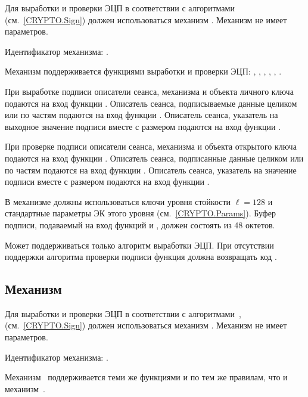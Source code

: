 Для выработки и проверки ЭЦП в соответствии с 
алгоритмами~ (см.~\ref{CRYPTO.Sign}) должен 
использоваться механизм .
%
Механизм не имеет параметров.

Идентификатор механизма: .

Механизм поддерживается функциями выработки и проверки ЭЦП: 
, , , 
, , .

При выработке подписи описатели сеанса, механизма и объекта личного ключа
подаются на вход функции . Описатель сеанса, подписываемые
данные целиком или по частям подаются на вход функции .
Описатель сеанса, указатель на выходное значение подписи вместе с размером
подаются на вход функции .

При проверке подписи описатели сеанса, механизма и объекта открытого ключа
подаются на вход функции . Описатель сеанса, подписанные
данные целиком или по частям подаются на вход функции .
Описатель сеанса, указатель на значение подписи вместе с размером подаются на
вход функции .

В механизме должны использоваться ключи уровня стойкости $\ell=128$ 
и стандартные параметры ЭК этого уровня (см.~\ref{CRYPTO.Params}).
% 
Буфер подписи, подаваемый на вход функций  и 
, должен состоять из 48 октетов.

Может поддерживаться только алгоритм выработки ЭЦП.
При отсутствии поддержки алгоритма проверки подписи
функция  должна возвращать код 
.

\subsection{Механизм }\label{CRYPTOKI.SignBash}

Для выработки и проверки ЭЦП в соответствии с 
алгоритмами~,  
(см.~\ref{CRYPTO.Sign}) должен использоваться механизм 
.
%
Механизм не имеет параметров.

Идентификатор механизма: .

Механизм~ поддерживается теми же функциями и по тем же 
правилам, что и механизм~.

